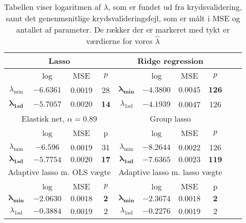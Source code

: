 \begin{table}
\center
\begin{tabular}{cccc | cccccc}
\toprule
   \multicolumn{4}{c}{Lasso} &  \multicolumn{4}{c}{Ridge regression}  \\ \midrule
 & log & MSE & $p$ & & log & MSE & $p$ \\
 $\lambda_{\min}$ &$-6.6361$& 0.0019 & 28 &	$\boldsymbol{\lambda_{\min}}$ &  $\mathbf{-4.3800}$ &   $\mathbf{0.0045} $&  $\mathbf{126}$ \\ 
 $\boldsymbol{\lambda}_{\textbf{1sd}}$ & $\mathbf{-5.7057}$ & $\mathbf{0.0020} $& $\mathbf{14}$ & $\lambda_{ \text{1sd}}$& $-4.1939$ & 0.0047 & 126  \\ \bottomrule \toprule
   \multicolumn{4}{c}{Elastisk net, $\alpha = 0.89$}  &  \multicolumn{4}{c}{Group lasso}  \\ \midrule
 & log & MSE & p && log & MSE &$ p $\\
 $\lambda_{\min}$ & $-6.596$ & 0.0019 & 31 & $\lambda_{\min}$& $-8.2644$ & 0.0022  & 126 \\
  $\boldsymbol{\lambda_{\textbf{1sd}}}$ & $\mathbf{-5.7754}$ & $\mathbf{0.0020} $& $\mathbf{17}$ &   $\boldsymbol{\lambda}_{\textbf{1sd}}$  & $\mathbf{-7.6365}$ &$ \mathbf{0.0023}$ & $\mathbf{119}$ \\  \bottomrule \toprule
  \multicolumn{4}{c}{Adaptive lasso m. OLS vægte}  &  \multicolumn{4}{c}{Adaptive lasso m. lasso vægte}  \\ \midrule
  & log & MSE & $p$ & & log & MSE & p \\
 $\boldsymbol{\lambda_{\min}}$  & $\mathbf{-2.0630}$ &$ \mathbf{0.0018}$ & $\mathbf{2}$ &  $\boldsymbol{\lambda_{\min}}$   &  $ \mathbf{-2.3674}$ & $ \mathbf{0.0018} $& $ \mathbf{2}$   \\
 $\lambda_{1\text{sd}}$ & $-0.3884$ & 0.0019 & 2 & $\lambda_{1\text{sd}}$  & $-0.2276$ & 0.0019 & 2  \\ \bottomrule
 \end{tabular}
\caption{Tabellen viser logaritmen af $\lambda$, som er  fundet ud fra krydsvalidering, samt det genenmsnitlige krydsvalideringsfejl, som er målt i MSE og antallet af parameter. De rækker der er markeret med tykt er værdierne for vores $\widehat{\lambda}$} \label{tab:cv_tab}
\end{table}
